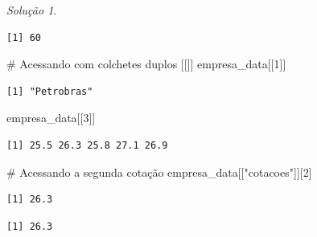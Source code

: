 \documentclass[
  portuguese,
  letterpaper,
  DIV=11,
  numbers=noendperiod]{scrreprt}
\newenvironment{Shaded}{\begin{snugshade}}{\end{snugshade}}
\newcommand{\CommentTok}[1]{\textcolor[rgb]{0.37,0.37,0.37}{#1}}
\newcommand{\DecValTok}[1]{\textcolor[rgb]{0.68,0.00,0.00}{#1}}
\newcommand{\NormalTok}[1]{\textcolor[rgb]{0.00,0.23,0.31}{#1}}
\newcommand{\SpecialCharTok}[1]{\textcolor[rgb]{0.37,0.37,0.37}{#1}}
\newcommand{\StringTok}[1]{\textcolor[rgb]{0.13,0.47,0.30}{#1}}
\theoremstyle{definition}
\theoremstyle{remark}
\newtheorem*{solution}{Solução}
\begin{document}
\begin{solution}
\begin{verbatim}
[1] 60
\end{verbatim}

\begin{Shaded}
\begin{Highlighting}[]
\CommentTok{\# Acessando com colchetes duplos [[]]}
\NormalTok{empresa\_data[[}\DecValTok{1}\NormalTok{]]}
\end{Highlighting}
\end{Shaded}

\begin{verbatim}
[1] "Petrobras"
\end{verbatim}

\begin{Shaded}
\begin{Highlighting}[]
\NormalTok{empresa\_data[[}\DecValTok{3}\NormalTok{]]}
\end{Highlighting}
\end{Shaded}

\begin{verbatim}
[1] 25.5 26.3 25.8 27.1 26.9
\end{verbatim}

\begin{Shaded}
\begin{Highlighting}[]
\CommentTok{\# Acessando a segunda cotação}
\NormalTok{empresa\_data[[}\StringTok{"cotacoes"}\NormalTok{]][}\DecValTok{2}\NormalTok{]}
\end{Highlighting}
\end{Shaded}

\begin{verbatim}
[1] 26.3
\end{verbatim}

\begin{Shaded}
\end{Shaded}

\begin{verbatim}
[1] 26.3
\end{verbatim}

\end{solution}
\end{document}
